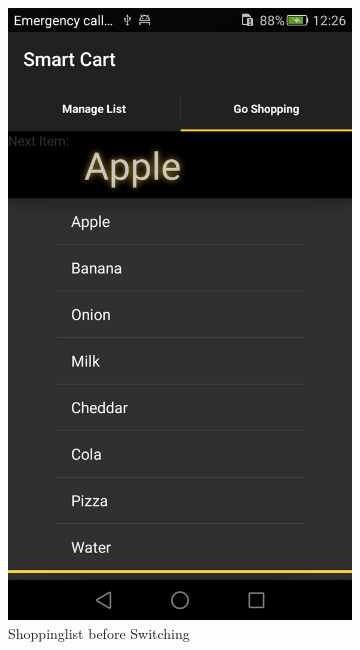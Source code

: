 \begin{figure}[h]
\captionsetup{justification=centering}
\begin{subfigure}{0.475\textwidth}
\centering 
\includegraphics[height= 0.3\textheight]{res/usermanual/notswitched.png}
\caption{Shoppinglist before Switching}
\label{fig:beforeSwitching}
\end{subfigure} \hspace{0.05\textwidth}
\begin{subfigure}{0.475\textwidth}

\end{subfigure}
\end{figure}
